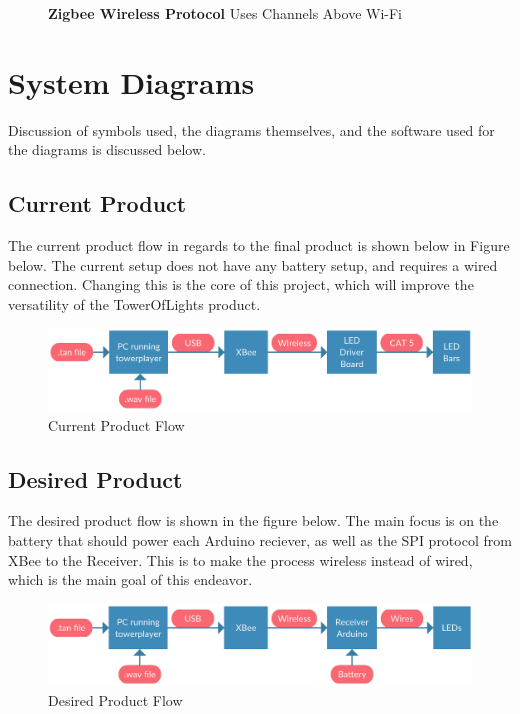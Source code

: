 \documentclass[12pt]{article}
\begin{document}
{{{\begin{itemize}
\begin{figure}[!htb]
					\caption{ \textbf{Zigbee Wireless Protocol} Uses Channels Above Wi-Fi \label{overflow}}
				\end{figure}
		\end{itemize}
		\clearpage	

\section{System Diagrams}
	Discussion of symbols used, the diagrams themselves, and the software used for the diagrams is discussed below.
	
	\subsection{Current Product}
	The current product flow in regards to the final product is shown below in Figure below. The current setup does not have any battery setup, and requires a wired connection. Changing this is the core of this project, which will improve the versatility of the TowerOfLights product.
	
		\begin{figure}[ht!]
			\centering
			\includegraphics[width=170mm]{assets/What_We_Have.png}
			\caption{Current Product Flow \label{overflow}}
		\end{figure}
	
	
	\subsection{Desired Product}
	The desired product flow is shown in the figure below. The main focus is on the battery that should power each Arduino reciever, as well as the SPI protocol from XBee to the Receiver. This is to make the process wireless instead of wired, which is the main goal of this endeavor.
	
	\begin{figure}[ht!]
		\centering
		\includegraphics[width=170mm]{assets/What_We_Want.png}
		\caption{Desired Product Flow \label{overflow}}
	\end{figure}


}}}
\end{document}
